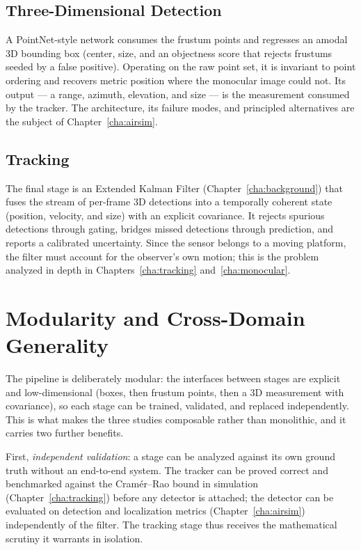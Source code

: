 \subsection{Three-Dimensional Detection}
A PointNet-style network \cite{qi2017pointnetpp} consumes the frustum points and
regresses an amodal 3D bounding box (center, size, and an objectness score that
rejects frustums seeded by a false positive). Operating on the raw point set, it is
invariant to point ordering and recovers metric position where the monocular image
could not. Its output --- a range, azimuth, elevation, and size --- is the
measurement consumed by the tracker. The architecture, its failure modes, and
principled alternatives are the subject of Chapter~\ref{cha:airsim}.

\subsection{Tracking}
The final stage is an Extended Kalman Filter
(Chapter~\ref{cha:background}) that fuses the stream of per-frame 3D detections
into a temporally coherent state (position, velocity, and size) with an
explicit covariance. It rejects spurious detections through gating, bridges
missed detections through prediction, and reports a calibrated
uncertainty. Since the sensor belongs to a moving platform, the filter must
account for the observer's own motion; this is the problem analyzed in depth in
Chapters~\ref{cha:tracking} and~\ref{cha:monocular}.

\section{Modularity and Cross-Domain Generality}
\label{sec:pipeline-modularity}

The pipeline is deliberately modular: the interfaces between stages are explicit
and low-dimensional (boxes, then frustum points, then a 3D measurement with
covariance), so each stage can be trained, validated, and replaced
independently. This is what makes the three studies composable rather than
monolithic, and it carries two further benefits.

First, \emph{independent validation}: a stage can be analyzed against its own
ground truth without an end-to-end system. The tracker can be proved correct and
benchmarked against the Cram\'er--Rao bound in simulation
(Chapter~\ref{cha:tracking}) before any detector is attached; the detector can be
evaluated on detection and localization metrics (Chapter~\ref{cha:airsim})
independently of the filter. The tracking stage thus receives the
mathematical scrutiny it warrants in isolation.

